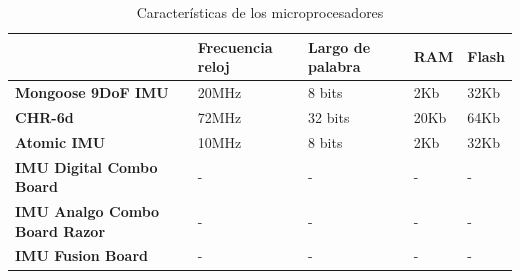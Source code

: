 \documentclass[main]{subfiles}
\begin{document}
\begin{table}[H]
\begin{tabular}{p{110pt}|p{65pt}|p{65pt}|p{60pt}|p{60pt}|} 

\cline{2-5} 
& \cellcolor[gray]{0.8} \textbf{Frecuencia reloj} 
& \cellcolor[gray]{0.8} \textbf{Largo de palabra}
& \cellcolor[gray]{0.8} \textbf{RAM} 
& \cellcolor[gray]{0.8} \textbf{Flash}\\ \cline{2-5} \hline
\multicolumn{1}{|p{110pt}|}{\cellcolor[gray]{0.8}\textbf{Mongoose 9DoF IMU}}
&  20MHz &  8 bits &  2Kb &  32Kb \\ \hline
\multicolumn{1}{|p{110pt}|}{\cellcolor[gray]{0.8}\textbf{CHR-6d}}
&  72MHz &  32 bits &  20Kb &  64Kb \\ \hline
\multicolumn{1}{|p{110pt}|}{\cellcolor[gray]{0.8}\textbf{Atomic IMU}}
&  10MHz  &  8 bits &  2Kb  &  32Kb \\ \hline
\multicolumn{1}{|p{110pt}|}{\cellcolor[gray]{0.8}\textbf{IMU Digital Combo Board}}
&  - &  - &  -  &  -\\ \hline
\multicolumn{1}{|p{110pt}|}{\cellcolor[gray]{0.8}\textbf{IMU Analgo Combo Board Razor}}
&  - &  -  &  - &  -\\ \hline
\multicolumn{1}{|p{110pt}|}{\cellcolor[gray]{0.8}\textbf{IMU Fusion Board}}
&  - &  -  &  - &  -\\
\hline 
\end{tabular}
\caption{Caracter\'isticas de los microprocesadores}
\label{tab:micro}
\end{table}
\end{document}
